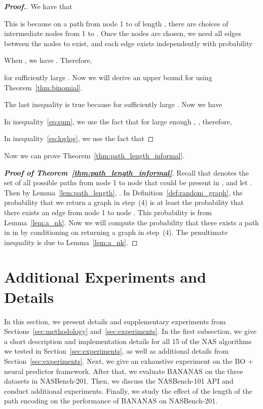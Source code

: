 \documentclass[11pt]{article}
\numberwithin{equation}{section}
\numberwithin{figure}{section}
\theoremstyle{plain}
\theoremstyle{definition}
\begin{document}
\begin{proof}[\textbf{Proof.}]
We have that 

This is because on a path from node 1 to  of length ,
there are  choices of intermediate
nodes from 1 to . Once the nodes are chosen, we need all 
edges between the nodes to exist, and each edge exists independently 
with probability 

When , we have .
Therefore,

for sufficiently large .
Now we will derive an upper bound for  using
Theorem~\ref{thm:binomial}.



The last inequality is true because
 for sufficiently large .
Now we have




In inequality~\ref{eq:sum}, we use the fact that for large enough ,
, therefore, 


In inequality~\ref{eq:loglog}, we use the fact that

\end{proof}


Now we can prove Theorem~\ref{thm:path_length_informal}.

\begin{proof}[\textbf{Proof of Theorem~\ref{thm:path_length_informal}}]

Recall that  denotes the set of all 
possible paths from node 1 to node  that could be present
in ,
and let .
Then by Lemma~\ref{lem:path_length}, .
In Definition~\ref{def:random_graph}, the probability that we return a
graph in step~(4) is at least the probability that there exists an edge
from node 1 to node . This probability is  from
Lemma~\ref{lem:a_nk}.
Now we will compute the probability that there exists a path in
 in 
by conditioning on returning a graph in step~(4).
The penultimate inequality is due to Lemma~\ref{lem:a_nk}.


\end{proof} \section{Additional Experiments and Details}
\label{app:experiments}

In this section, we present details and supplementary experiments from 
Sections~\ref{sec:methodology} and~\ref{sec:experiments}.
In the first subsection, we give a short description and implementation
details for all 15 of the NAS algorithms we tested in Section~\ref{sec:experiments},
as well as additional details from Section~\ref{sec:experiments}.
Next, we give an exhaustive experiment on the
BO + neural predictor framework.
After that, we evaluate BANANAS
on the three datasets in NASBench-201.
Then,
we discuss the NASBench-101 API and conduct additional experiments.
Finally,
we study the effect of the length of the path encoding on the performance of BANANAS
on NASBench-201.
\end{document}
